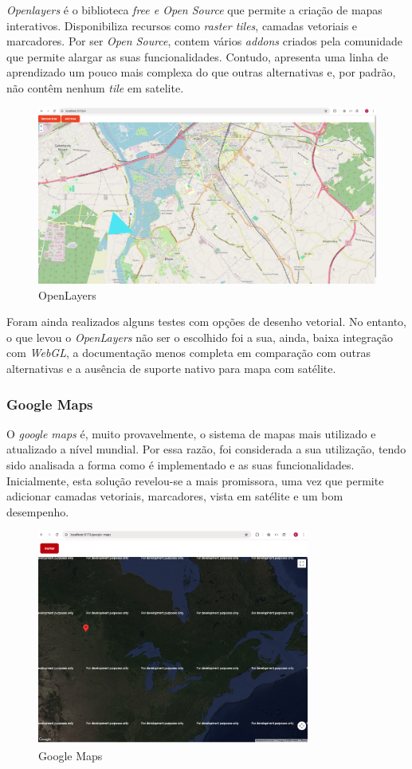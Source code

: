 \textit{Openlayers} é o biblioteca \textit{free e Open Source} que permite a criação de mapas interativos. Disponibiliza recursos como \textit{raster tiles}, camadas vetoriais e marcadores. Por ser \textit{Open Source}, contem vários \textit{addons} criados pela comunidade que permite alargar as suas funcionalidades. Contudo, apresenta uma linha de aprendizado um pouco mais complexa do que outras alternativas e, por padrão, não contêm  nenhum \textit{tile} em satelite. 

\begin{figure}[h!]
    \includegraphics[width=\textwidth]{figs/ol.png}
    \caption[Ol]{OpenLayers}
    \label{fig:ol}
\end{figure}

Foram ainda realizados alguns testes com opções de desenho vetorial. No entanto, o que levou o \textit{OpenLayers} não ser o escolhido foi a sua, ainda, baixa integração com \textit{WebGL}, a documentação menos completa em comparação com outras alternativas e a ausência de suporte nativo para mapa com satélite. 

\subsubsection{\textbf{Google Maps}}\label{sec:sub_gm}
O \textit{google maps} é, muito provavelmente, o sistema de mapas mais utilizado e atualizado a nível mundial. Por essa razão, foi considerada a sua utilização, tendo sido analisada a forma como é implementado e as suas funcionalidades. Inicialmente, esta solução revelou-se a mais promissora, uma vez que permite adicionar camadas vetoriais, marcadores, vista em satélite e um bom desempenho. 

\begin{figure}[h!]
    \centering
    \includegraphics[width=8.95cm]{figs/gm.png}
    \caption[gm]{Google Maps}
    \label{fig:gm}
\end{figure}

